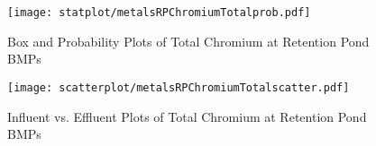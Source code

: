         \begin{figure}[hb]   %
            \centering
            \texttt{[image: statplot/metalsRPChromiumTotalprob.pdf]}
            \caption{Box and Probability Plots of Total Chromium at Retention Pond BMPs}
        \end{figure}         %
        
        
        \begin{figure}[hb]   %
            \centering
            \texttt{[image: scatterplot/metalsRPChromiumTotalscatter.pdf]}
            \caption{Influent vs. Effluent Plots of Total Chromium at Retention Pond BMPs}
        \end{figure}         %
        \clearpage
        